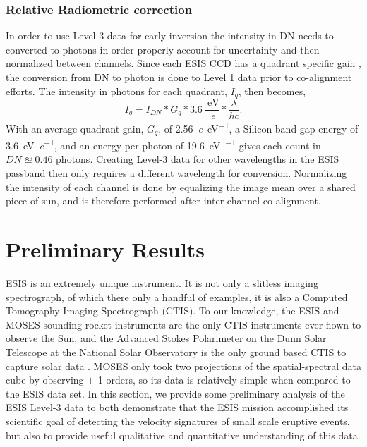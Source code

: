           \subsubsection{Relative Radiometric correction }	 
   	In order to use Level-3 data for early inversion the intensity in DN needs to  converted to photons in order properly account for uncertainty and then normalized between channels.
   		Since each ESIS CCD has a quadrant specific gain \citep{ESIS}, the conversion from DN to photon is done to Level 1 data prior to co-alignment efforts.
   		The intensity in photons for each quadrant, $I_q$, then becomes,
   		\begin{equation}
	   		I_q = I_{DN} * G_q * 3.6\ \frac{\SI{}{\electronvolt}}{\SI{}{\elementarycharge}} * \frac{\lambda}{hc}.
   		\end{equation}
		With an average quadrant gain, $G_q$, of \SI[per-mode=symbol]{2.56}{\elementarycharge\per\electronvolt}, a Silicon band gap energy of \SI[per-mode=symbol]{3.6}{\electronvolt\per\elementarycharge}, and an energy per \ov photon of \SI[per-mode=symbol]{19.6}{\electronvolt\per\photon} gives each count in $DN \approxeq 0.46$ photons.
		Creating Level-3 data for other wavelengths in the ESIS passband then only requires a different wavelength for conversion.
   		Normalizing the intensity of each channel is done by equalizing the image mean over a shared piece of sun, and is therefore performed after inter-channel co-alignment. 
  

\section{Preliminary Results}

	   ESIS is an extremely unique instrument.  It is not only a slitless imaging spectrograph, of which there only a handful of examples, it is also a Computed Tomography Imaging Spectrograph (CTIS).  To our knowledge, the ESIS and MOSES sounding rocket instruments are the only CTIS instruments ever flown to observe the Sun, and  the Advanced Stokes Polarimeter on the Dunn Solar Telescope at the National Solar Observatory is the only ground based CTIS to capture solar data \citep{deforest2004}.  MOSES only took two projections of the spatial-spectral data cube by observing $\pm$ 1 orders, so its data is relatively simple when compared to the ESIS data set.   In this section, we provide some preliminary analysis of the ESIS Level-3 data to both demonstrate that the ESIS mission accomplished its scientific goal of detecting the velocity signatures of small scale eruptive events, but also to provide useful qualitative and quantitative understanding of this data.  
		
